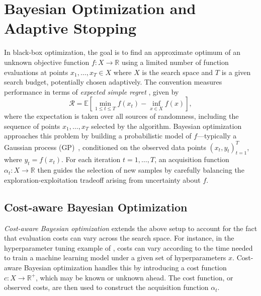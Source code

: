 \section{Bayesian Optimization and Adaptive Stopping}
\label{sec:background}


In black-box optimization, the goal is to find an approximate optimum of an unknown objective function $f : X \to \mathbb{R}$ using a limited number of function evaluations at points $x_1, \ldots, x_T \in X$ where $X$ is the search space and $T$ is a given search budget, potentially chosen adaptively. 
The convention measures performance in terms of \emph{expected simple regret} \citep[Sec. 10.1]{garnett2023bayesian}, given by
\begin{equation}
\label{eqn:bayesopt_problem}
\mathcal{R} = \mathbb{E} \left[\min_{1\leq t\leq T} f(x_t) - \inf_{x\in X} f(x) \right],
\end{equation}
where the expectation is taken over all sources of randomness, including the sequence of points $x_1, \ldots, x_T$ selected by the algorithm.
Bayesian optimization approaches this problem by building a probabilistic model of $f$---typically a Gaussian process (GP)~\citep{rasmussen2006gaussian}, conditioned on the observed data points $(x_t, y_t)_{t=1}^T$, where $y_t = f(x_t)$. 
For each iteration $t=1,\ldots,T$, an acquisition function $\alpha_{t}: X \to \mathbb{R}$ then guides the selection of new samples by carefully balancing the exploration-exploitation tradeoff arising from uncertainty about $f$. 


\subsection{Cost-aware Bayesian Optimization}
\label{sec:background:acquisition}
\emph{Cost-aware Bayesian optimization} \citep{lee2020cost,astudillo2021multi} extends the above setup to account for the fact that evaluation costs can vary across the search space.
For instance, in the hyperparameter tuning example of , costs can vary according to the time needed to train a machine learning model under a given set of hyperparameters $x$.
Cost-aware Bayesian optimization handles this by introducing a cost function $c: X \to \mathbb{R}^+$, which may be known or unknown ahead.
The cost function, or observed costs, are then used to construct the acquisition function $\alpha_t$.

